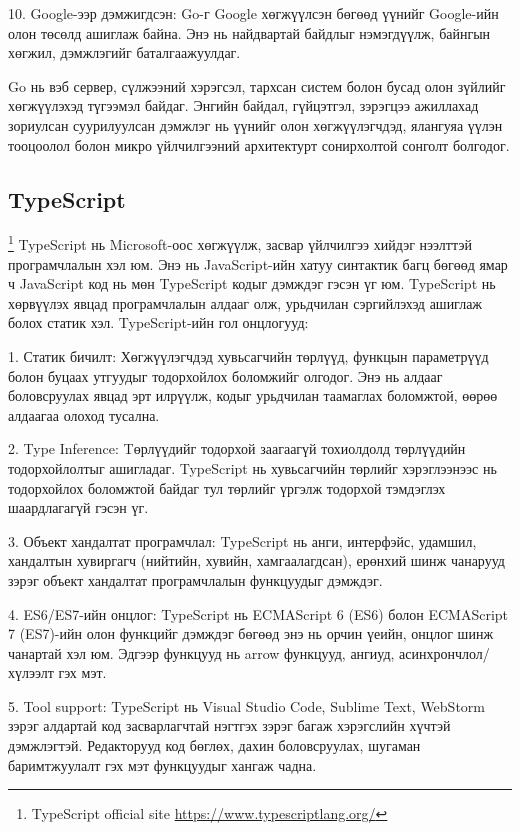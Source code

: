 		10. Google-ээр дэмжигдсэн: Go-г Google хөгжүүлсэн бөгөөд үүнийг Google-ийн олон төсөлд ашиглаж байна. Энэ нь найдвартай байдлыг нэмэгдүүлж, байнгын хөгжил, дэмжлэгийг баталгаажуулдаг.
		
		Go нь вэб сервер, сүлжээний хэрэгсэл, тархсан систем болон бусад олон зүйлийг хөгжүүлэхэд түгээмэл байдаг. Энгийн байдал, гүйцэтгэл, зэрэгцээ ажиллахад зориулсан суурилуулсан дэмжлэг нь үүнийг олон хөгжүүлэгчдэд, ялангуяа үүлэн тооцоолол болон микро үйлчилгээний архитектурт сонирхолтой сонголт болгодог.
	\pagebreak
\subsection{TypeScript}
		\footnote{TypeScript official site \url{https://www.typescriptlang.org/}}
			\quad \quad TypeScript нь Microsoft-оос хөгжүүлж, засвар үйлчилгээ хийдэг нээлттэй програмчлалын хэл юм. Энэ нь JavaScript-ийн хатуу синтактик багц бөгөөд ямар ч JavaScript код нь мөн TypeScript кодыг дэмждэг гэсэн үг юм. TypeScript нь хөрвүүлэх явцад програмчлалын алдааг олж, урьдчилан сэргийлэхэд ашиглаж болох статик хэл. TypeScript-ийн гол онцлогууд:

			1. Статик бичилт: Хөгжүүлэгчдэд хувьсагчийн төрлүүд, функцын параметрүүд болон буцаах утгуудыг тодорхойлох боломжийг олгодог. Энэ нь алдааг боловсруулах явцад эрт илрүүлж, кодыг урьдчилан таамаглах боломжтой, өөрөө алдаагаа олоход тусална.
			
			2. Type Inference: Tөрлүүдийг тодорхой заагаагүй тохиолдолд төрлүүдийн тодорхойлолтыг ашигладаг. TypeScript нь хувьсагчийн төрлийг хэрэглээнээс нь тодорхойлох боломжтой байдаг тул төрлийг үргэлж тодорхой тэмдэглэх шаардлагагүй гэсэн үг.
			
			3. Объект хандалтат програмчлал: TypeScript нь анги, интерфэйс, удамшил, хандалтын хувиргагч (нийтийн, хувийн, хамгаалагдсан), ерөнхий шинж чанарууд зэрэг объект хандалтат програмчлалын функцуудыг дэмждэг.
			
			4. ES6/ES7-ийн онцлог: TypeScript нь ECMAScript 6 (ES6) болон ECMAScript 7 (ES7)-ийн олон функцийг дэмждэг бөгөөд энэ нь орчин үеийн, онцлог шинж чанартай хэл юм. Эдгээр функцууд нь arrow функцууд, ангиуд, асинхрончлол/хүлээлт гэх мэт.
			
			5. Tool support: TypeScript нь Visual Studio Code, Sublime Text, WebStorm зэрэг алдартай код засварлагчтай нэгтгэх зэрэг багаж хэрэгслийн хүчтэй дэмжлэгтэй. Редакторууд код бөглөх, дахин боловсруулах, шугаман баримтжуулалт гэх мэт функцуудыг хангаж чадна.
			
